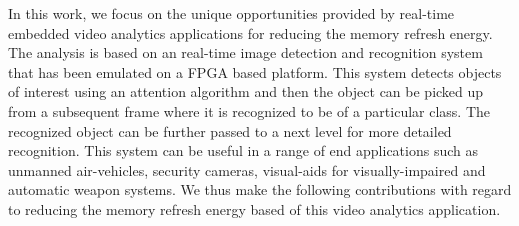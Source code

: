 In this work, we focus on the unique opportunities provided by real-time embedded video analytics applications for reducing the memory refresh energy. The analysis is based on an real-time image detection and recognition system that has been emulated on a FPGA based platform. This system detects objects of interest using an attention algorithm and then the object can be picked up from a subsequent frame where it is recognized to be of a particular class. The recognized object can be further passed to a next level for more detailed recognition. This system can be useful in a range of end applications such as unmanned air-vehicles, security cameras, visual-aids for visually-impaired and automatic weapon systems. We thus make the following contributions with regard to reducing the memory refresh energy based of this video analytics application.

